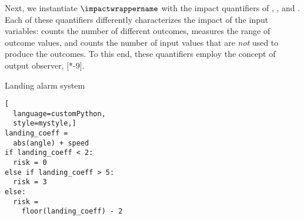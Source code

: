 Next, we instantiate $\impactwrappername$ with the impact quantifiers of \outcomesname{}, \rangename{}, and \qusedname{}. Each of these quantifiers differently characterizes the impact of the input variables: \outcomesname{} counts the number of different outcomes, \rangename{} measures the range of outcome values, and \qusedname{} counts the number of input values that are \emph{not} used to produce the outcomes.
To this end, these quantifiers employ the concept of output observer, \cf{} [*-9].




\begin{marginlisting}
  \caption{Landing alarm system}
  \vspace{\lineheight}
\begin{lstlisting}[
  language=customPython,
  style=mystyle,]
landing_coeff =
  abs(angle) + speed
if landing_coeff < 2:
  risk = 0
else if landing_coeff > 5:
  risk = 3
else:
  risk =
    floor(landing_coeff) - 2
  \end{lstlisting}
\end{marginlisting}

